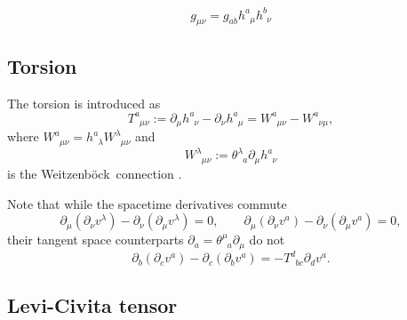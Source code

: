 \documentclass[
10pt, %
a4paper, %
oneside, %
headinclude,footinclude, %
BCOR5mm, %
]{scrartcl}
\newcommand{\pd}[1]{\partial_{#1}}
\newcommand{\tetrsymbol}{h}
\newcommand{\itetrsymbol}{\theta}
\newcommand{\itetr}[2]{\itetrsymbol^{#1}_{\phantom{#1}#2}}
\newcommand{\tetr}[2]{\tetrsymbol^{#1}_{\phantom{#1}#2}}
\newcommand{\rtetr}[2]{h^{#1}_{\mathsmaller{(r)} #2}}
\newcommand{\spin}[2]{\omega^{#1}_{\phantom{#1}#2}}
\newcommand{\D}[1]{\partial_{#1}} %
\newcommand{\Tors}[2]{T^{#1}_{\phantom{a}#2}}
\newcommand{\w}[2]{W^{#1}_{\phantom{#1}#2}}
\newcommand{\We}{Weitzenb\"ock}
\begin{document}
\begin{equation}
	g_{\mu\nu} = g_{ab} \tetr{a}{\mu}\tetr{b}{\nu}
\end{equation}









\subsection{Torsion}

The torsion is introduced as
\begin{equation}\label{eqn.def.tors}
\Tors{a}{\mu\nu}:=\D{\mu}\tetr{a}{\nu} - \D{\nu}\tetr{a}{\mu} = 
\w{a}{\mu\nu} - \w{a}{\nu\mu},
\end{equation}
where $ \w{a}{\mu\nu} = \tetr{a}{\lambda}\w{\lambda}{\mu\nu}$ and 
\begin{equation}
\w{\lambda}{\mu\nu} := 
\itetr{\lambda}{a}\pd{\mu} \tetr{a}{\nu}
\end{equation}
is the \We\ connection \cite{AldrovandiPereiraBook,KleinertMultivalued}.


Note that while the spacetime derivatives commute
\begin{equation}\label{eqn.commut.D}
\D{\mu}(\D{\nu} v^\lambda) - \D{\nu}(\D{\mu} v^\lambda) = 0, 
\qquad 
\D{\mu}(\D{\nu} v^a) - \D{\nu}(\D{\mu} v^a) = 0,
\end{equation}
their tangent space counterparts $\D{a} = \itetr{\mu}{a}\D{\mu}$ do not
\begin{equation}
\D{b}(\D{c} v^a) - \D{c}(\D{b} v^a) = 
-\Tors{d}{b c}\D{d}v^a .
\end{equation}

%


\subsection{Levi-Civita tensor}
\end{document}
